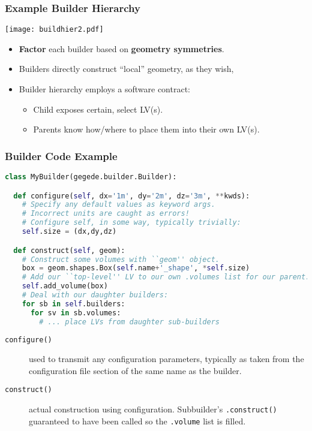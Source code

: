 \documentclass[10pt,xcolor=dvipsnames]{beamer}
\begin{document}
\begin{frame}[fragile]
  \frametitle{Example Builder Hierarchy}
  \vspace{-5mm}
  \begin{center}
    \texttt{[image: buildhier2.pdf]}    
  \end{center}
  \vspace{-5mm}
  
  \begin{itemize}
  \item \textbf{Factor} each builder based on \textbf{geometry symmetries}.
  \item Builders directly construct ``local'' geometry, as they wish, 
  \item Builder hierarchy employs a software contract:
    \begin{itemize}\footnotesize
    \item Child exposes certain, select LV(s).
    \item Parents know how/where to place them into their own LV(s).
    \end{itemize}
  \end{itemize}
\end{frame}

\begin{frame}[fragile]
  \frametitle{Builder Code Example}

  \footnotesize

  \begin{lstlisting}[language=Python]
class MyBuilder(gegede.builder.Builder):

  def configure(self, dx='1m', dy='2m', dz='3m', **kwds):
    # Specify any default values as keyword args.
    # Incorrect units are caught as errors!
    # Configure self, in some way, typically trivially:
    self.size = (dx,dy,dz)

  def construct(self, geom):
    # Construct some volumes with ``geom'' object.
    box = geom.shapes.Box(self.name+'_shape', *self.size)
    # Add our ``top-level'' LV to our own .volumes list for our parent.
    self.add_volume(box)   
    # Deal with our daughter builders:
    for sb in self.builders:
      for sv in sb.volumes:
        # ... place LVs from daughter sub-builders
  \end{lstlisting}

  \begin{description}
  \item[\texttt{configure()}] used to transmit any configuration parameters, typically as taken from the configuration file section of the same name as the builder.
  \item[\texttt{construct()}] actual construction using configuration.  Subbuilder's \texttt{.construct()} guaranteed to have been called so the \texttt{.volume} list is filled.
  \end{description}

\end{frame}
\end{document}

